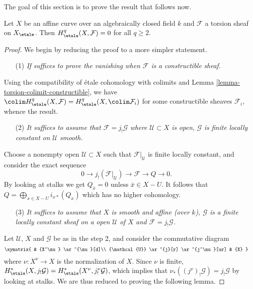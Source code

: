 \noindent
The goal of this section is to prove the result that follows now.

\begin{theorem}
\label{theorem-vanishing-affine-curves}
Let $X$ be an affine curve over an algebraically closed field $k$ and
$\mathcal{F}$ a torsion sheaf on $X_\etale$. Then
$H_\etale^q(X, \mathcal{F}) = 0$ for all $q\geq 2$.
\end{theorem}

\begin{proof}
We begin by reducing the proof to a more simpler statement.
\begin{enumerate}
\item[(1)] {\it If suffices to prove the vanishing when $\mathcal{F}$
is a constructible sheaf.}
\end{enumerate}

\noindent
Using the compatibility of \'etale cohomology with colimits and
Lemma \ref{lemma-torsion-colimit-constructible},
we have $\colim H_\etale^q(X, \mathcal{F}) =
H_\etale^q(X, \colim \mathcal{F}_i)$ for some
constructible sheaves $\mathcal{F}_i$, whence the result.

\begin{enumerate}
\item[(2)]
{\it It suffices to assume that $\mathcal{F} = j_!\mathcal{G}$ where
$\mathcal{U}\subset X$ is open, $\mathcal{G}$ is finite locally constant on
$\mathcal{U}$ smooth.}
\end{enumerate}

\noindent
Choose a nonempty open $\mathcal{U}\subset X$ such that
$\mathcal{F}|_\mathcal{U}$ is finite locally constant, and consider the exact
sequence
$$
0\to j_!(\mathcal{F}|_\mathcal{U})\to \mathcal{F}\to Q\to 0.
$$
By looking at stalks we get $Q_{\bar x}=0$ unless $\bar x\in X-U$. It follows
that $\displaystyle Q = \bigoplus_{x\in X-U} i_{x*} (Q_x)$
which has no higher cohomology.

\begin{enumerate}
\item[(3)]
{\it It suffices to assume that $X$ is smooth and affine (over $k$),
$\mathcal{G}$ is a finite locally constant sheaf on a open $\mathcal{U}$ of $X$
and $\mathcal{F} = j_!\mathcal{G}$.}
\end{enumerate}

\noindent
Let $\mathcal{U}$, $X$ and $\mathcal{G}$ be as in the step 2, and consider the
commutative diagram
$$
\xymatrix{
& {X^\nu} \ar^{\nu}[d]\\
{\mathcal{U}} \ar^{j}[r] \ar^{j^\nu}[ur] & {X}
}
$$
where $\nu: X^\nu \to X$ is the normalization of $X$. Since $\nu$ is finite,
$H_\etale^*(X, j_!\mathcal{G}) =
H_\etale^*(X^\nu, j^\nu_!\mathcal{G})$, which
implies that $\nu_*((j^\nu)_!\mathcal{G}) = j_!\mathcal{G}$ by looking at
stalks. We are thus reduced to proving the following lemma.
\end{proof}

